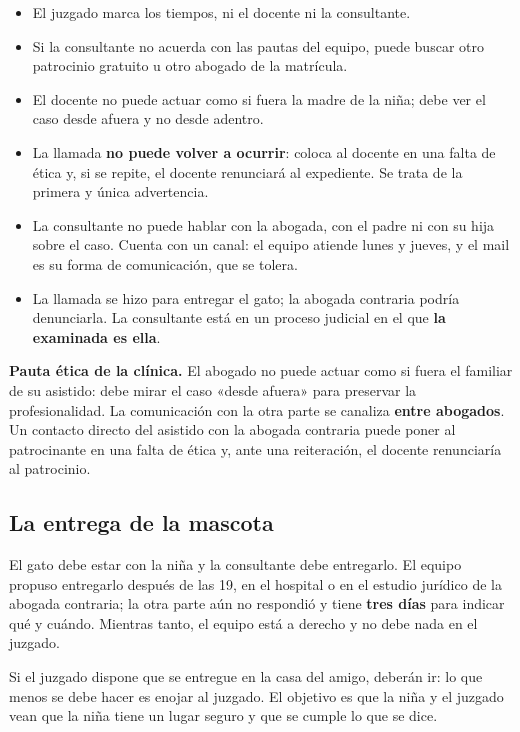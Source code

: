 \documentclass[12pt,oneside]{book}
\begin{document}
\begin{itemize}
    \item El juzgado marca los tiempos, ni el docente ni la consultante.
    \item Si la consultante no acuerda con las pautas del equipo, puede buscar otro patrocinio gratuito u otro abogado de la matrícula.
    \item El docente no puede actuar como si fuera la madre de la niña; debe ver el caso desde afuera y no desde adentro.
    \item La llamada \textbf{no puede volver a ocurrir}: coloca al docente en una falta de ética y, si se repite, el docente renunciará al expediente. Se trata de la primera y única advertencia.
    \item La consultante no puede hablar con la abogada, con el padre ni con su hija sobre el caso. Cuenta con un canal: el equipo atiende lunes y jueves, y el mail es su forma de comunicación, que se tolera.
    \item La llamada se hizo para entregar el gato; la abogada contraria podría denunciarla. La consultante está en un proceso judicial en el que \textbf{la examinada es ella}.
\end{itemize}

\begin{important}
\textbf{Pauta ética de la clínica.} El abogado no puede actuar como si fuera el familiar de su asistido: debe mirar el caso «desde afuera» para preservar la profesionalidad. La comunicación con la otra parte se canaliza \textbf{entre abogados}. Un contacto directo del asistido con la abogada contraria puede poner al patrocinante en una falta de ética y, ante una reiteración, el docente renunciaría al patrocinio.
\end{important}

\subsection{La entrega de la mascota}

El gato debe estar con la niña y la consultante debe entregarlo. El equipo propuso entregarlo después de las 19, en el hospital o en el estudio jurídico de la abogada contraria; la otra parte aún no respondió y tiene \textbf{tres días} para indicar qué y cuándo. Mientras tanto, el equipo está a derecho y no debe nada en el juzgado.

Si el juzgado dispone que se entregue en la casa del amigo, deberán ir: lo que menos se debe hacer es enojar al juzgado. El objetivo es que la niña y el juzgado vean que la niña tiene un lugar seguro y que se cumple lo que se dice.
\end{document}
